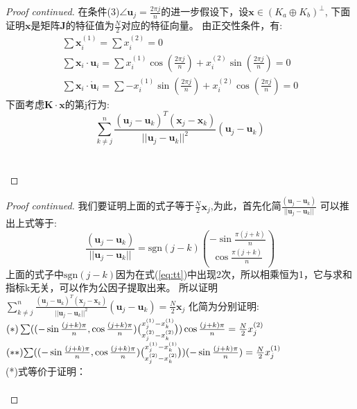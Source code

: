 \documentclass[notheorems,xetex,mathserif,serif]{beamer}
\begin{document}
\begin{frame}
\begin{proof}[Proof continued]
  在条件(3)$\angle\bm{u}_j=\frac{2\pi j}{n}$的进一步假设下，设$\bm{x}\in (K_a\oplus K_b)^{\bot}$,
  下面证明$\bm{x}$是矩阵$\bm{J}$的特征值为$\frac{N}{2}$对应的特征向量。
  由正交性条件，有:
\begin{eqnarray}
\sum \bm{x}_i^{(1)}=\sum x_i^{(2)}=0\\
\sum \bm{x}_i \cdot \bm{u}_i=\sum x_i^{(1)} \cos(\frac{2\pi j}{n})+x_i^{(2)} \sin(\frac{2\pi j}{n}) =0\label{eq:coupling1}\\
\sum \bm{x}_i \cdot \mathring{\bm{u}}_i=\sum -x_i^{(1)} \sin(\frac{2\pi j}{n})+x_i^{(2)} \cos(\frac{2\pi j}{n}) =0\label{eq:coupling2}
\end{eqnarray}
下面考虑$\bm{K}\cdot \bm{x}$的第j行为:
\begin{equation}\label{eq:tt}
\sum_{k\neq j}^n \frac{(\bm{u}_j-\bm{u}_k)^T(\bm{x}_j-\bm{x}_k)}{||\bm{u}_j-\bm{u}_k||^2}(\bm{u}_j-\bm{u}_k)
\end{equation}
\quad\\
\quad\\
\end{proof}
\end{frame}
\begin{frame}
\begin{proof}[Proof continued]
我们要证明上面的式子等于$\frac{N}{2}\bm{x}_j$,为此，首先化简$\frac{(\bm{u}_j-\bm{u}_k)}{||\bm{u}_j-\bm{u}_k||}$
可以推出上式等于:
\begin{equation}
\frac{(\bm{u}_j-\bm{u}_k)}{||\bm{u}_j-\bm{u}_k||}=\text{sgn}(j-k)\binom{-\sin\frac{\pi(j+k)}{n}}{\cos\frac{\pi(j+k)}{n}}
\end{equation}
上面的式子中$\text{sgn}(j-k)$因为在式(\ref{eq:tt})中出现2次，所以相乘恒为1，它与求和指标k无关，可以作为公因子提取出来。
所以证明
$\sum_{k\neq j}^n \frac{(\bm{u}_j-\bm{u}_k)^T(\bm{x}_j-\bm{x}_k)}{||\bm{u}_j-\bm{u}_k||^2}(\bm{u}_j-\bm{u}_k)=\frac{N}{2}\bm{x}_j
$
化简为分别证明:
$\scriptsize{
(*)\sum ((-\sin\frac{(j+k)\pi}{n},\cos\frac{(j+k)\pi}{n})\binom{x_j^{(1)}-x_k^{(1)}}{x_j^{(2)}-x_k^{(2)}})
\cos\frac{(j+k)\pi}{n}=\frac{N}{2}x_j^{(2)}}$
$(**)\scriptsize{\sum ((-\sin\frac{(j+k)\pi}{n},\cos\frac{(j+k)\pi}{n})\binom{x_j^{(1)}-x_k^{(1)}}{x_j^{(2)}-x_k^{(2)}})
(-\sin\frac{(j+k)\pi}{n})=\frac{N}{2}x_j^{(1)}}$\\
(*)式等价于证明：\\
\quad\\
\end{proof}
\end{frame}
\end{document}
